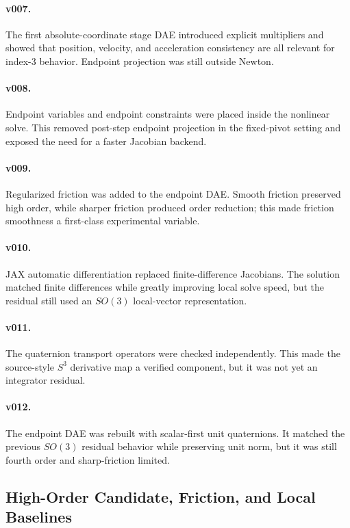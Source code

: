 \documentclass[10pt]{article}
\begin{document}
\paragraph{v007.}
The first absolute-coordinate stage DAE introduced explicit multipliers and
showed that position, velocity, and acceleration consistency are all relevant
for index-3 behavior. Endpoint projection was still outside Newton.

\paragraph{v008.}
Endpoint variables and endpoint constraints were placed inside the nonlinear
solve. This removed post-step endpoint projection in the fixed-pivot setting
and exposed the need for a faster Jacobian backend.

\paragraph{v009.}
Regularized friction was added to the endpoint DAE. Smooth friction preserved
high order, while sharper friction produced order reduction; this made
friction smoothness a first-class experimental variable.

\paragraph{v010.}
JAX automatic differentiation replaced finite-difference Jacobians. The
solution matched finite differences while greatly improving local solve speed,
but the residual still used an $SO(3)$ local-vector representation.

\paragraph{v011.}
The quaternion transport operators were checked independently. This made the
source-style $S^3$ derivative map a verified component, but it was not yet an
integrator residual.

\paragraph{v012.}
The endpoint DAE was rebuilt with scalar-first unit quaternions. It matched the
previous $SO(3)$ residual behavior while preserving unit norm, but it was still
fourth order and sharp-friction limited.

\subsection{High-Order Candidate, Friction, and Local Baselines}
\end{document}
